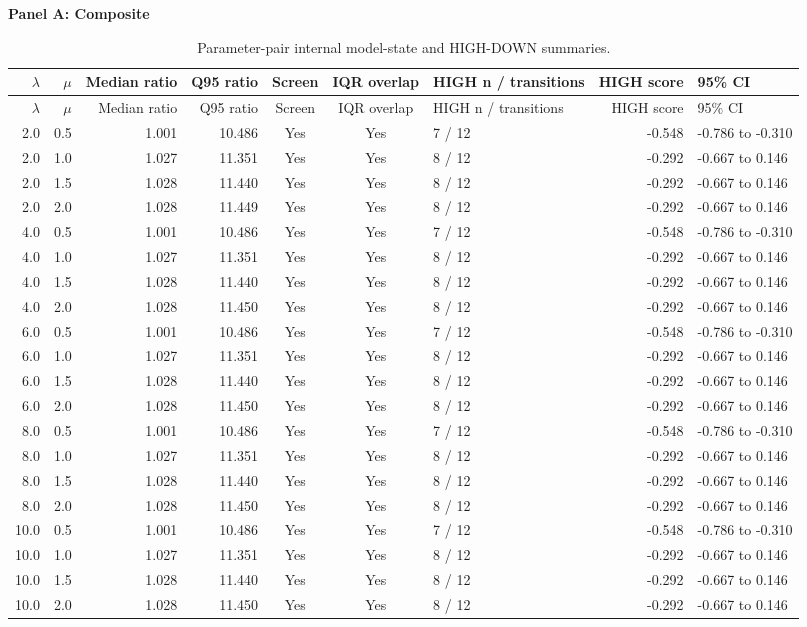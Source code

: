 \begingroup
\small
\renewcommand{\arraystretch}{1.05}
\setlength{\tabcolsep}{5pt}
\clearpage
\thispagestyle{empty}
\noindent\textbf{Panel A: Composite}\par\vspace{0.4em}
\begin{longtable}{r r r r c c l r p{2.7cm}}
\caption{Parameter-pair internal model-state and HIGH-DOWN summaries.}\label{tab:S4}\\
\toprule
$\lambda$ & $\mu$ & Median ratio & Q95 ratio & Screen & IQR overlap & HIGH n / transitions & HIGH score & 95\% CI \\
\midrule\endfirsthead
\toprule
$\lambda$ & $\mu$ & Median ratio & Q95 ratio & Screen & IQR overlap & HIGH n / transitions & HIGH score & 95\% CI \\
\midrule\endhead
2.0 & 0.5 & 1.001 & 10.486 & Yes & Yes & 7 / 12 & -0.548 & -0.786 to -0.310 \\
2.0 & 1.0 & 1.027 & 11.351 & Yes & Yes & 8 / 12 & -0.292 & -0.667 to 0.146 \\
2.0 & 1.5 & 1.028 & 11.440 & Yes & Yes & 8 / 12 & -0.292 & -0.667 to 0.146 \\
2.0 & 2.0 & 1.028 & 11.449 & Yes & Yes & 8 / 12 & -0.292 & -0.667 to 0.146 \\
4.0 & 0.5 & 1.001 & 10.486 & Yes & Yes & 7 / 12 & -0.548 & -0.786 to -0.310 \\
4.0 & 1.0 & 1.027 & 11.351 & Yes & Yes & 8 / 12 & -0.292 & -0.667 to 0.146 \\
4.0 & 1.5 & 1.028 & 11.440 & Yes & Yes & 8 / 12 & -0.292 & -0.667 to 0.146 \\
4.0 & 2.0 & 1.028 & 11.450 & Yes & Yes & 8 / 12 & -0.292 & -0.667 to 0.146 \\
6.0 & 0.5 & 1.001 & 10.486 & Yes & Yes & 7 / 12 & -0.548 & -0.786 to -0.310 \\
6.0 & 1.0 & 1.027 & 11.351 & Yes & Yes & 8 / 12 & -0.292 & -0.667 to 0.146 \\
6.0 & 1.5 & 1.028 & 11.440 & Yes & Yes & 8 / 12 & -0.292 & -0.667 to 0.146 \\
6.0 & 2.0 & 1.028 & 11.450 & Yes & Yes & 8 / 12 & -0.292 & -0.667 to 0.146 \\
8.0 & 0.5 & 1.001 & 10.486 & Yes & Yes & 7 / 12 & -0.548 & -0.786 to -0.310 \\
8.0 & 1.0 & 1.027 & 11.351 & Yes & Yes & 8 / 12 & -0.292 & -0.667 to 0.146 \\
8.0 & 1.5 & 1.028 & 11.440 & Yes & Yes & 8 / 12 & -0.292 & -0.667 to 0.146 \\
8.0 & 2.0 & 1.028 & 11.450 & Yes & Yes & 8 / 12 & -0.292 & -0.667 to 0.146 \\
10.0 & 0.5 & 1.001 & 10.486 & Yes & Yes & 7 / 12 & -0.548 & -0.786 to -0.310 \\
10.0 & 1.0 & 1.027 & 11.351 & Yes & Yes & 8 / 12 & -0.292 & -0.667 to 0.146 \\
10.0 & 1.5 & 1.028 & 11.440 & Yes & Yes & 8 / 12 & -0.292 & -0.667 to 0.146 \\
10.0 & 2.0 & 1.028 & 11.450 & Yes & Yes & 8 / 12 & -0.292 & -0.667 to 0.146 \\
\bottomrule
\end{longtable}
